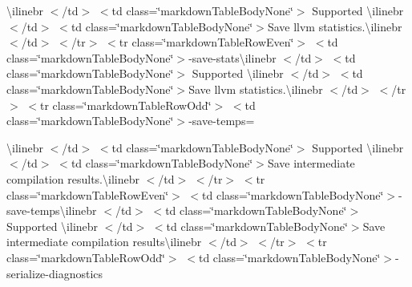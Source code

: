 \begin{longtabu}
{\ttfamily \textbackslash{}ilinebr \texorpdfstring{$<$}{<}/td\texorpdfstring{$>$}{>} \texorpdfstring{$<$}{<}td class=\char`\"{}markdown\+Table\+Body\+None\char`\"{}\texorpdfstring{$>$}{>} Supported \textbackslash{}ilinebr \texorpdfstring{$<$}{<}/td\texorpdfstring{$>$}{>} \texorpdfstring{$<$}{<}td class=\char`\"{}markdown\+Table\+Body\+None\char`\"{}\texorpdfstring{$>$}{>}}Save llvm statistics.{\ttfamily \textbackslash{}ilinebr \texorpdfstring{$<$}{<}/td\texorpdfstring{$>$}{>} \texorpdfstring{$<$}{<}/tr\texorpdfstring{$>$}{>} \texorpdfstring{$<$}{<}tr class=\char`\"{}markdown\+Table\+Row\+Even\char`\"{}\texorpdfstring{$>$}{>} \texorpdfstring{$<$}{<}td class=\char`\"{}markdown\+Table\+Body\+None\char`\"{}\texorpdfstring{$>$}{>}}-\/save-\/stats{\ttfamily \textbackslash{}ilinebr \texorpdfstring{$<$}{<}/td\texorpdfstring{$>$}{>} \texorpdfstring{$<$}{<}td class=\char`\"{}markdown\+Table\+Body\+None\char`\"{}\texorpdfstring{$>$}{>} Supported \textbackslash{}ilinebr \texorpdfstring{$<$}{<}/td\texorpdfstring{$>$}{>} \texorpdfstring{$<$}{<}td class=\char`\"{}markdown\+Table\+Body\+None\char`\"{}\texorpdfstring{$>$}{>}}Save llvm statistics.{\ttfamily \textbackslash{}ilinebr \texorpdfstring{$<$}{<}/td\texorpdfstring{$>$}{>} \texorpdfstring{$<$}{<}/tr\texorpdfstring{$>$}{>} \texorpdfstring{$<$}{<}tr class=\char`\"{}markdown\+Table\+Row\+Odd\char`\"{}\texorpdfstring{$>$}{>} \texorpdfstring{$<$}{<}td class=\char`\"{}markdown\+Table\+Body\+None\char`\"{}\texorpdfstring{$>$}{>}}-\/save-\/temps=

{\ttfamily \textbackslash{}ilinebr \texorpdfstring{$<$}{<}/td\texorpdfstring{$>$}{>} \texorpdfstring{$<$}{<}td class=\char`\"{}markdown\+Table\+Body\+None\char`\"{}\texorpdfstring{$>$}{>} Supported \textbackslash{}ilinebr \texorpdfstring{$<$}{<}/td\texorpdfstring{$>$}{>} \texorpdfstring{$<$}{<}td class=\char`\"{}markdown\+Table\+Body\+None\char`\"{}\texorpdfstring{$>$}{>}}Save intermediate compilation results.{\ttfamily \textbackslash{}ilinebr \texorpdfstring{$<$}{<}/td\texorpdfstring{$>$}{>} \texorpdfstring{$<$}{<}/tr\texorpdfstring{$>$}{>} \texorpdfstring{$<$}{<}tr class=\char`\"{}markdown\+Table\+Row\+Even\char`\"{}\texorpdfstring{$>$}{>} \texorpdfstring{$<$}{<}td class=\char`\"{}markdown\+Table\+Body\+None\char`\"{}\texorpdfstring{$>$}{>}}-\/save-\/temps{\ttfamily \textbackslash{}ilinebr \texorpdfstring{$<$}{<}/td\texorpdfstring{$>$}{>} \texorpdfstring{$<$}{<}td class=\char`\"{}markdown\+Table\+Body\+None\char`\"{}\texorpdfstring{$>$}{>} Supported \textbackslash{}ilinebr \texorpdfstring{$<$}{<}/td\texorpdfstring{$>$}{>} \texorpdfstring{$<$}{<}td class=\char`\"{}markdown\+Table\+Body\+None\char`\"{}\texorpdfstring{$>$}{>}}Save intermediate compilation results{\ttfamily \textbackslash{}ilinebr \texorpdfstring{$<$}{<}/td\texorpdfstring{$>$}{>} \texorpdfstring{$<$}{<}/tr\texorpdfstring{$>$}{>} \texorpdfstring{$<$}{<}tr class=\char`\"{}markdown\+Table\+Row\+Odd\char`\"{}\texorpdfstring{$>$}{>} \texorpdfstring{$<$}{<}td class=\char`\"{}markdown\+Table\+Body\+None\char`\"{}\texorpdfstring{$>$}{>}}-\/serialize-\/diagnostics 


\end{longtabu}

